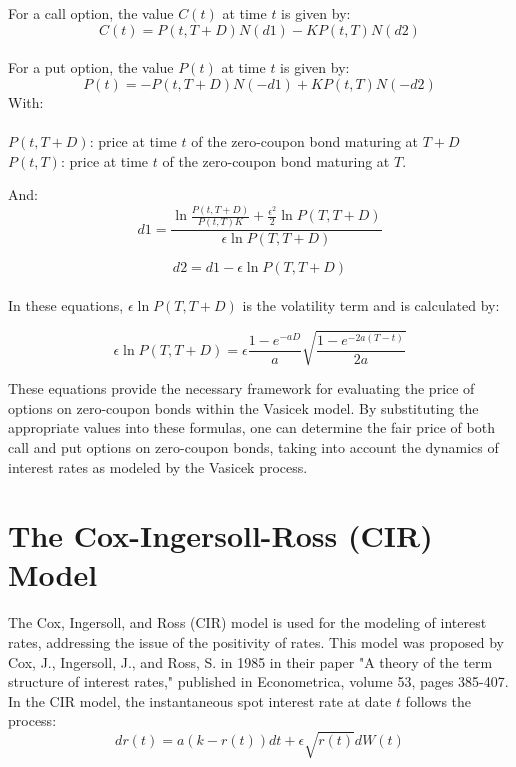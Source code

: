 \documentclass[a4paper,10pt]{article}
\begin{document}
\noindent For a call option, the value \( C(t) \) at time \( t \) is given by: 
\[C(t) = P(t, T + D)N(d1) - KP(t, T)N(d2)\]\\
\noindent For a put option, the value \( P(t) \) at time \( t \) is given by:
\[P(t) = -P(t, T + D)N(-d1) + KP(t, T)N(-d2)\]
 \noindent With:\\\\
\noindent \( P(t, T + D) \): price at time \( t \) of the zero-coupon bond maturing at \( T + D \)\\
\newline \noindent \( P(t, T) \): price at time \( t \) of the zero-coupon bond maturing at \( T \). 

\noindent And:\\
\[d1 = \frac{\ln \frac{P(t, T + D)}{P(t, T)K} + \frac{\epsilon^2}{2} \ln P(T, T + D)}{\epsilon \ln P(T, T + D)}\]

\[d2 = d1 - \epsilon \ln P(T, T + D)\]\\

\noindent In these equations, \( \epsilon \ln P(T, T + D) \) is the volatility term and is calculated by:

\[\epsilon \ln P(T, T + D) = \epsilon \frac{1 - e^{-aD}}{a} \sqrt{\frac{1 - e^{-2a(T-t)}}{2a}}\]

\noindent These equations provide the necessary framework for evaluating the price of options on zero-coupon bonds within the Vasicek model. By substituting the appropriate values into these formulas, one can determine the fair price of both call and put options on zero-coupon bonds, taking into account the dynamics of interest rates as modeled by the Vasicek process. \\

\section{The Cox-Ingersoll-Ross (CIR) Model}

\noindent The Cox, Ingersoll, and Ross (CIR) model is used for the modeling of interest rates, addressing the issue of the positivity of rates. This model was proposed by Cox, J., Ingersoll, J., and Ross, S. in 1985 in their paper "A theory of the term structure of interest rates," published in Econometrica, volume 53, pages 385-407. \\

\noindent In the CIR model, the instantaneous spot interest rate at date \( t \) follows the process:
\[dr(t) = a(k - r(t))dt + \epsilon \sqrt{r(t)} dW(t)\]
\end{document}
